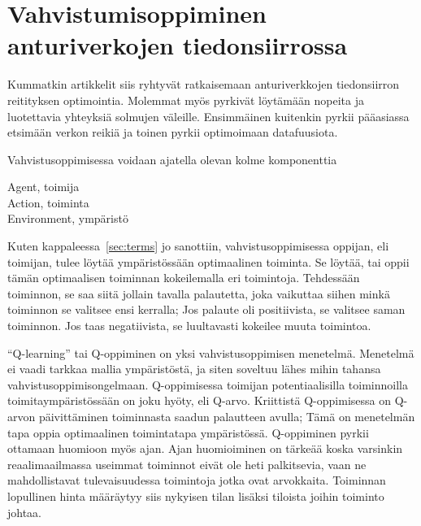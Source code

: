
\section{Vahvistumisoppiminen anturiverkojen tiedonsiirrossa}

Kummatkin artikkelit siis ryhtyvät ratkaisemaan anturiverkkojen tiedonsiirron
reitityksen optimointia. Molemmat myös pyrkivät löytämään nopeita ja
luotettavia yhteyksiä solmujen väleille. Ensimmäinen kuitenkin pyrkii
pääasiassa etsimään verkon reikiä ja toinen pyrkii optimoimaan datafuusiota.

Vahvistusoppimisessa voidaan ajatella olevan kolme komponenttia
\begin{description}
  \item[Agent, toimija] 
  \item[Action, toiminta] 
  \item[Environment, ympäristö] 
\end{description}
Kuten kappaleessa~\ref{sec:terms} jo sanottiin, vahvistusoppimisessa oppijan,
eli toimijan, tulee löytää ympäristössään optimaalinen toiminta. Se löytää, tai
oppii tämän optimaalisen toiminnan kokeilemalla eri toimintoja. Tehdessään
toiminnon, se saa siitä jollain tavalla palautetta, joka vaikuttaa siihen minkä
toiminnon se valitsee ensi kerralla; Jos palaute oli positiivista, se valitsee
saman toiminnon. Jos taas negatiivista, se luultavasti kokeilee muuta
toimintoa.

``Q-learning'' tai Q-oppiminen on yksi vahvistusoppimisen menetelmä. Menetelmä
ei vaadi tarkkaa mallia ympäristöstä, ja siten soveltuu lähes mihin tahansa
vahvistusoppimisongelmaan.  Q-oppimisessa toimijan potentiaalisilla
toiminnoilla toimitaympäristössään on joku hyöty, eli Q-arvo. Kriittistä
Q-oppimisessa on Q-arvon päivittäminen toiminnasta saadun palautteen avulla;
Tämä on menetelmän tapa oppia optimaalinen toimintatapa ympäristössä.
Q-oppiminen pyrkii ottamaan huomioon myös ajan. Ajan huomioiminen on tärkeää
koska varsinkin reaalimaailmassa useimmat toiminnot eivät ole heti palkitsevia,
vaan ne mahdollistavat tulevaisuudessa toimintoja jotka ovat arvokkaita.
Toiminnan lopullinen hinta määräytyy siis nykyisen tilan lisäksi tiloista
joihin toiminto johtaa.~\parencite{Kaelbling1996}

